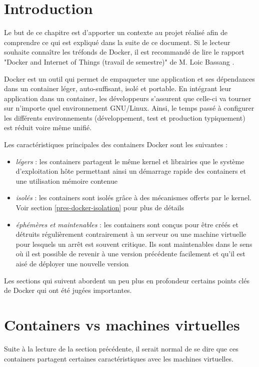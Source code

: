 \newcommand{\bassangPrjSemestre}{Docker and Internet of Things (travail de semestre)}
\newcommand{\bassangPrjBachelor}{Docker and Internet of Things (travail de Bachelor)}
\section{Introduction}

Le but de ce chapitre est d'apporter un contexte au projet réalisé afin de comprendre ce qui est expliqué dans la suite de ce document. Si le lecteur souhaite connaître les tréfonds de Docker, il est recommandé de lire le rapport "\bassangPrjSemestre" de M. Loic Bassang \cite{bassang_semestre}. 

Docker est un outil qui permet de empaqueter une application et ses dépendances dans un container léger, auto-suffisant, isolé et portable. En intégrant leur application dans un container, les développeurs s'assurent que celle-ci va tourner sur n'importe quel environnement GNU/Linux. Ainsi, le temps passé à configurer les différents environnements (développement, test et production typiquement) est réduit voire même unifié\cite{shipping_container_linux_code}\cite{wikipedia_docker}\cite{what_is_docker}.

Les caractéristiques principales des containers Docker sont les suivantes :
\begin{itemize}
\item \textit{légers} : les containers partagent le même kernel et librairies que le système d'exploitation hôte permettant ainsi un démarrage rapide des containers et une utilisation mémoire contenue
\item \textit{isolés} : les containers sont isolés grâce à des mécanismes offerts par le kernel. Voir section \ref{pres-docker-isolation} pour plus de détails
\item \textit{éphémères et maintenables} : les containers sont conçus pour être créés et détruits régulièrement contrairement à un serveur ou une machine virtuelle pour lesquels un arrêt est souvent critique. Ils sont maintenables dans le sens où il est possible de revenir à une version précédente facilement et qu'il est aisé de déployer une nouvelle version
\end{itemize}

Les sections qui suivent abordent un peu plus en profondeur certains points clés de Docker qui ont été jugées importantes.

\section{Containers vs machines virtuelles}
Suite à la lecture de la section précédente, il serait normal de se dire que ces containers partagent certaines caractéristiques avec les machines virtuelles.

